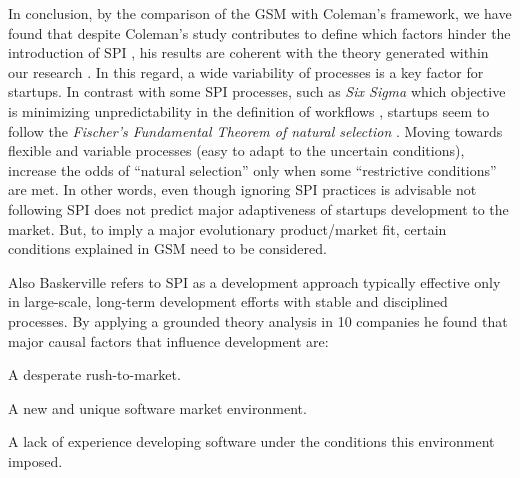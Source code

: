 \documentclass[10pt,journal,letterpaper,compsoc]{IEEEtran}
\begin{document}
In conclusion, by the comparison of the GSM with Coleman's framework, we have found that despite Coleman's study contributes to define which factors hinder the introduction of SPI%
, his results are coherent with the theory generated within our research%
. In this regard, a wide variability of processes is a key factor for startups. In contrast with some SPI processes, such as \textit{Six Sigma} which objective is minimizing unpredictability in the definition of workflows \cite{Sixsigma}, startups seem to follow the \textit{Fischer's Fundamental Theorem of natural selection} \cite{Fisher}. Moving towards flexible and variable processes (easy to adapt to the uncertain conditions), increase the odds of ``natural selection'' only when some ``restrictive conditions'' are met. In other words, even though ignoring SPI practices is advisable%
 not following SPI does not predict major adaptiveness of startups development to the market. But, to imply a major evolutionary product/market fit, certain conditions explained in GSM need to be considered. 

Also Baskerville \cite{Internet} refers to SPI as a development approach typically effective only in large-scale, long-term development efforts with stable and disciplined processes. By applying a grounded theory analysis in 10 companies he found that major causal factors that influence development are: 


\begin{compactenum}

\item A desperate rush-to-market.
\item A new and unique software market environment.
\item A lack of experience developing software under the conditions this environment imposed.


\end{compactenum}
\end{document}
